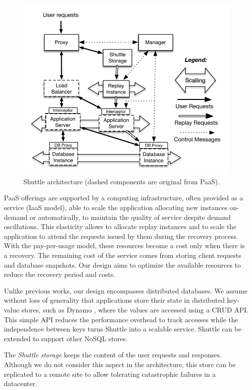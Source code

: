 \begin{figure}
  \centering
  \includegraphics[width=0.8\columnwidth]{images/architectureTiers}
  \caption{Shuttle architecture (dashed components are original from \ac{PaaS}). %
  }
  \label{fig:shuttle_architecture}
\end{figure}

PaaS offerings are supported by a computing infrastructure, often provided as a service (IaaS model), able to scale the application allocating new instances on-demand or automatically, to maintain the quality of service despite demand oscillations. This elasticity  allows to allocate replay instances and to scale the application to attend the requests issued by them during the recovery process.
With the pay-per-usage model, these resources become a cost only when there is a recovery. The remaining cost of the service comes from storing client requests and database snapshots. Our design aims to optimize the available resources to reduce the recovery period and costs. 


Unlike previous works, our design encompasses distributed databases. We assume without loss of generality that applications store their state in distributed key-value stores, such as Dynamo \cite{Decandia2007}, where the values are accessed using a \acf{CRUD} API. This simple API reduces the performance overhead to track accesses while the independence between keys turns Shuttle into a scalable service. Shuttle can be extended to support other NoSQL stores.

The \emph{Shuttle storage} keeps the content of the user requests and responses. Although we do not consider this aspect in the architecture, this store can be replicated to a remote site to allow tolerating catastrophic failures in a datacenter.

